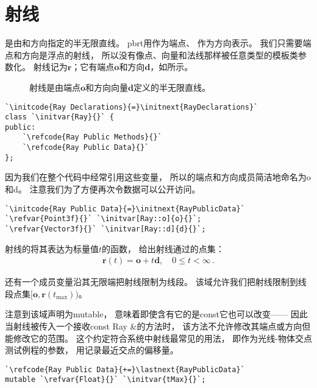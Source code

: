 \section{射线}\label{sec:射线}

是由和方向指定的半无限直线。
pbrt用作为端点、
作为方向表示。
我们只需要端点和方向是浮点的射线，
所以没有像点、向量和法线那样被任意类型的模板类参数化。
射线记为$\bm r$；它有端点$\bm o$和方向$\bm d$，如所示。
\begin{figure}[htbp]
    \centering
    \caption{射线是由端点$\bm o$和方向向量$\bm d$定义的半无限直线。}
    \label{fig:2.7}
\end{figure}

\begin{lstlisting}
`\initcode{Ray Declarations}{=}\initnext{RayDeclarations}`
class `\initvar{Ray}{}` {
public:
    `\refcode{Ray Public Methods}{}`
    `\refcode{Ray Public Data}{}`
};
\end{lstlisting}

因为我们在整个代码中经常引用这些变量，
所以的端点和方向成员简洁地命名为{\ttfamily o}和{\ttfamily d}。
注意我们为了方便再次令数据可以公开访问。
\begin{lstlisting}
`\initcode{Ray Public Data}{=}\initnext{RayPublicData}`
`\refvar{Point3f}{}` `\initvar[Ray::o]{o}{}`;
`\refvar{Vector3f}{}` `\initvar[Ray::d]{d}{}`;
\end{lstlisting}

射线的将其表达为标量值$t$的函数，
给出射线通过的点集：
\begin{align}\label{eq:2.3}
    \bm r(t)=\bm o+t\bm d,\quad 0\le t<\infty\, .
\end{align}

还有一个成员变量沿其无限端把射线限制为线段。
该域允许我们把射线限制到线段点集$[\bm o,\bm r(t_{\max}))$。

注意到该域声明为{\ttfamily mutable}，
意味着即使含有它的是{\ttfamily const}它也可以改变——
因此当射线被传入一个接收{\ttfamily const Ray \&}的方法时，
该方法不允许修改其端点或方向但能修改它的范围。
这个约定符合系统中射线最常见的用法，
即作为光线-物体交点测试例程的参数，
用记录最近交点的偏移量。
\begin{lstlisting}
`\refcode{Ray Public Data}{+=}\lastnext{RayPublicData}`
mutable `\refvar{Float}{}` `\initvar{tMax}{}`;
\end{lstlisting}

